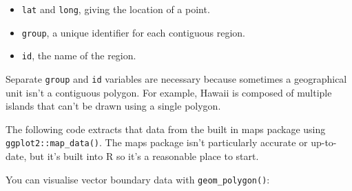 \begin{itemize}
\tightlist
\item
  \texttt{lat} and \texttt{long}, giving the location of a point.
\item
  \texttt{group}, a unique identifier for each contiguous region.
\item
  \texttt{id}, the name of the region.
\end{itemize}

Separate \texttt{group} and \texttt{id} variables are necessary because
sometimes a geographical unit isn't a contiguous polygon. For example,
Hawaii is composed of multiple islands that can't be drawn using a
single polygon.

The following code extracts that data from the built in maps package
using \texttt{ggplot2::map\_data()}. The maps package isn't particularly
accurate or up-to-date, but it's built into R so it's a reasonable place
to start. 

\begin{Shaded}
\end{Shaded}

You can visualise vector boundary data with \texttt{geom\_polygon()}:

\begin{Shaded}
\begin{Highlighting}[]
\StringTok{  }\NormalTok{(}\NormalTok{(} \StringTok{ }
\StringTok{  }\NormalTok{()}

\StringTok{  }\NormalTok{(}\NormalTok{(}  \NormalTok{, } \NormalTok{) +}\StringTok{ }
\StringTok{  }\NormalTok{()}
\end{Highlighting}
\end{Shaded}

